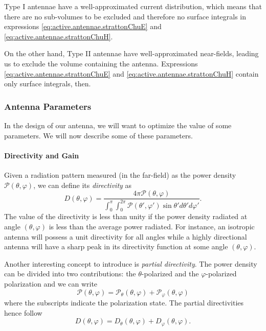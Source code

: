 Type I antennae have a well-approximated current distribution, which means that there are no
sub-volumes to be excluded and therefore no surface integrals in expressions 
\eqref{eq:active.antennae.strattonChuE} and \eqref{eq:active.antennae.strattonChuH}. 

On the other hand, Type II antennae have well-approximated near-fields, leading
us to exclude the volume containing the antenna. Expressions \eqref{eq:active.antennae.strattonChuE}
and \eqref{eq:active.antennae.strattonChuH} contain only surface integrals, then.

\subsubsection{Antenna Parameters}
In the design of our antenna, we will want to optimize the value
of some parameters. We will now describe some of these parameters.

\paragraph[Directivity and Gain]{Directivity and Gain \cite[\S 1.16]{ELL2003}}
Given a radiation pattern measured (in the far-field) as the power density 
$\mathcal{P}(\theta,\varphi)$, we can define its \textit{directivity}
as
  \begin{equation}
   D(\theta,\varphi) = \frac{4\pi\mathcal{P}(\theta,\varphi)}
			{\int_0^\pi\int_0^{2\pi}\mathcal{P}(\theta',\varphi')\sin\theta'd\theta'd\varphi'}.
  \end{equation}
The value of the directivity is less than unity if the power density radiated at angle $(\theta,\varphi)$
is less than the average power radiated. For instance, an isotropic antenna will possess a unit directivity
for all angles while a highly directional antenna will have a sharp peak  in its directivity function 
at some angle $(\theta,\varphi)$.

Another interesting concept to introduce is \textit{partial directivity}. 
The power density can be divided into two contributions: the $\theta$-polarized
and the $\varphi$-polarized polarization and we can write
  \begin{equation}
    \mathcal{P}(\theta,\varphi) = \mathcal{P}_\theta(\theta,\varphi)+\mathcal{P}_\varphi(\theta,\varphi)
  \end{equation}
where the subscripts indicate the polarization state. The partial 
directivities hence follow
  \begin{equation}
   D(\theta,\varphi) = D_\theta(\theta,\varphi)+D_\varphi(\theta,\varphi).
  \end{equation}

